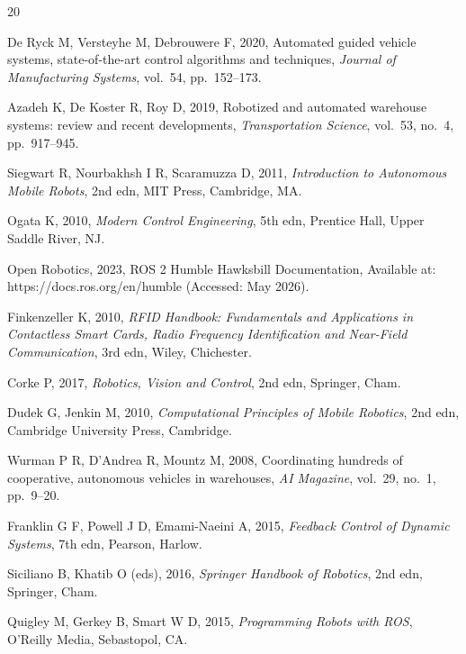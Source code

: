\documentclass[12pt,a4paper,oneside]{report}
\begin{document}
\begin{thebibliography}{20}

 De Ryck M, Versteyhe M, Debrouwere F, 2020, Automated guided vehicle systems, state-of-the-art control algorithms and techniques, \textit{Journal of Manufacturing Systems}, vol.~54, pp.~152--173.

 Azadeh K, De Koster R, Roy D, 2019, Robotized and automated warehouse systems: review and recent developments, \textit{Transportation Science}, vol.~53, no.~4, pp.~917--945.

 Siegwart R, Nourbakhsh I R, Scaramuzza D, 2011, \textit{Introduction to Autonomous Mobile Robots}, 2nd edn, MIT Press, Cambridge, MA.

 Ogata K, 2010, \textit{Modern Control Engineering}, 5th edn, Prentice Hall, Upper Saddle River, NJ.

 Open Robotics, 2023, ROS 2 Humble Hawksbill Documentation, Available at: https://docs.ros.org/en/humble (Accessed: May 2026).

 Finkenzeller K, 2010, \textit{RFID Handbook: Fundamentals and Applications in Contactless Smart Cards, Radio Frequency Identification and Near-Field Communication}, 3rd edn, Wiley, Chichester.

 Corke P, 2017, \textit{Robotics, Vision and Control}, 2nd edn, Springer, Cham.

 Dudek G, Jenkin M, 2010, \textit{Computational Principles of Mobile Robotics}, 2nd edn, Cambridge University Press, Cambridge.

 Wurman P R, D'Andrea R, Mountz M, 2008, Coordinating hundreds of cooperative, autonomous vehicles in warehouses, \textit{AI Magazine}, vol.~29, no.~1, pp.~9--20.

 Franklin G F, Powell J D, Emami-Naeini A, 2015, \textit{Feedback Control of Dynamic Systems}, 7th edn, Pearson, Harlow.

 Siciliano B, Khatib O (eds), 2016, \textit{Springer Handbook of Robotics}, 2nd edn, Springer, Cham.

 Quigley M, Gerkey B, Smart W D, 2015, \textit{Programming Robots with ROS}, O'Reilly Media, Sebastopol, CA.


\end{thebibliography}
\end{document}

